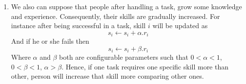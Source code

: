 \documentclass[]{article}
\begin{document}
\begin{enumerate}
	\item We also can suppose that people after handling a task, grow some knowledge and experience. Consequently, their skills are gradually increased. For instance after being successful in a task, skill $i$ will be updated as
	\begin{equation}
		s_i \leftarrow s_i + \alpha.r_i
	\end{equation}
	And if he or she fails then
	\begin{equation}
		s_i \leftarrow s_i + \beta.r_i
	\end{equation}
	Where $\alpha$ and $\beta$ both are configurable parameters such that $0<\alpha<1$, $0<\beta<1$,  $\alpha>\beta$. Hence, if one task requires one specific skill more than other, person will increase that skill more comparing other ones.
	
\end{enumerate}



\end{document}
